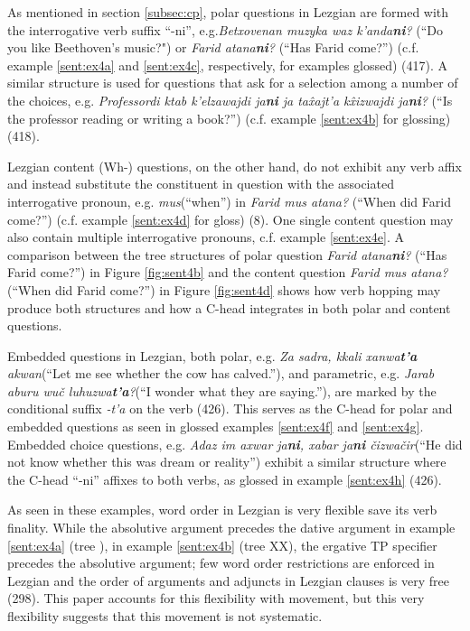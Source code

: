 As mentioned in section \ref{subsec:cp}, polar questions in Lezgian are formed with the interrogative verb suffix ``-ni'', e.g.\textit{Betxovenan muzyka waz k'anda\textbf{ni}?} (``Do you like Beethoven's music?") or \textit{Farid atana\textbf{ni}?} (``Has Farid come?'') (c.f. example \ref{sent:ex4a} and \ref{sent:ex4c}, respectively, for examples glossed) (417). A similar structure is used for questions that ask for a selection among a number of the choices, e.g. \textit{Professordi ktab k'elzawajdi ja\textbf{ni} ja ta\^{x}ajt'a k\^{x}izwajdi ja\textbf{ni}?} (``Is the professor reading or writing a book?'') (c.f. example \ref{sent:ex4b} for glossing) (418).

Lezgian content (Wh-) questions, on the other hand, do not exhibit any verb affix and instead substitute the constituent in question with the associated interrogative pronoun, e.g. \textit{mus}(``when'') in \textit{Farid mus atana?} (``When did Farid come?'') (c.f. example \ref{sent:ex4d} for gloss) (8). One single content question may also contain multiple interrogative pronouns, c.f. example \ref{sent:ex4e}. A comparison between the tree structures of polar question \textit{Farid atana\textbf{ni}?} (``Has Farid come?'') in Figure \ref{fig:sent4b} and the content question \textit{Farid mus atana?} (``When did Farid come?'') in Figure \ref{fig:sent4d} shows how verb hopping may produce both structures and how a C-head integrates in both polar and content questions. 

Embedded questions in Lezgian, both polar, e.g. \textit{Za sadra, kkali xanwa\textbf{t'a} akwan}(``Let me see whether the cow has calved.''), and parametric, e.g. \textit{Jarab aburu wu\v{c} luhuzwa\textbf{t'a}?}(``I wonder what they are saying.''), are marked by the conditional suffix \textit{-t'a} on the verb (426). This serves as the C-head for polar and embedded questions as seen in glossed examples \ref{sent:ex4f} and \ref{sent:ex4g}. Embedded choice questions, e.g. \textit{Adaz im axwar ja\textbf{ni}, xabar ja\textbf{ni} \v{c}izwa\v{c}ir}(``He did not know whether this was dream or reality'') exhibit a similar structure where the C-head ``-ni'' affixes to both verbs, as glossed in example \ref{sent:ex4h} (426).

As seen in these examples, word order in Lezgian is very flexible save its verb finality. While the absolutive argument precedes the dative argument in example \ref{sent:ex4a} (tree ), in example \ref{sent:ex4b} (tree XX), the ergative TP specifier precedes the absolutive argument; few word order restrictions are enforced in Lezgian and the order of arguments and adjuncts in Lezgian clauses is very free (298). This paper accounts for this flexibility with movement, but this very flexibility suggests that this movement is not systematic. 